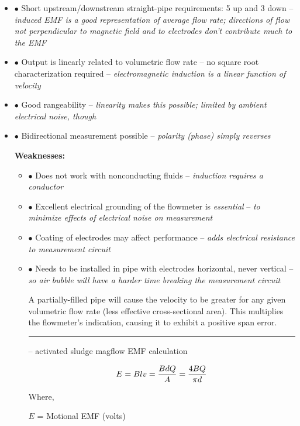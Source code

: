 \begin{itemize}
\item{$\bullet$} Short upstream/downstream straight-pipe requirements: 5 up and 3 down -- {\it induced EMF is a good representation of average flow rate; directions of flow not perpendicular to magnetic field and to electrodes don't contribute much to the EMF}
\item{$\bullet$} Output is linearly related to volumetric flow rate -- no square root characterization required -- {\it electromagnetic induction is a linear function of velocity}
\item{$\bullet$} Good rangeability -- {\it linearity makes this possible; limited by ambient electrical noise, though}
\item{$\bullet$} Bidirectional measurement possible -- {\it polarity (phase) simply reverses}
\medskip

\vskip 10pt

{\bf Weaknesses:}

\begin{itemize}
\item{$\bullet$} Does not work with nonconducting fluids -- {\it induction requires a conductor}
\item{$\bullet$} Excellent electrical grounding of the flowmeter is {\it essential} -- {\it to minimize effects of electrical noise on measurement}
\item{$\bullet$} Coating of electrodes may affect performance -- {\it adds electrical resistance to measurement circuit}
\item{$\bullet$} Needs to be installed in pipe with electrodes horizontal, never vertical -- {\it so air bubble will have a harder time breaking the measurement circuit}
\medskip

\vskip 10pt

A partially-filled pipe will cause the velocity to be greater for any given volumetric flow rate (less effective cross-sectional area).  This multiplies the flowmeter's indication, causing it to exhibit a positive span error.

\filbreak \vskip 5pt \hrule \vskip 5pt  -- activated sludge magflow EMF calculation \vskip 10pt

$$E = Blv = {B d Q \over A} = {4 B Q \over \pi d}$$

\noindent
Where,

$E$ = Motional EMF (volts)


\end{itemize}
\end{itemize}
